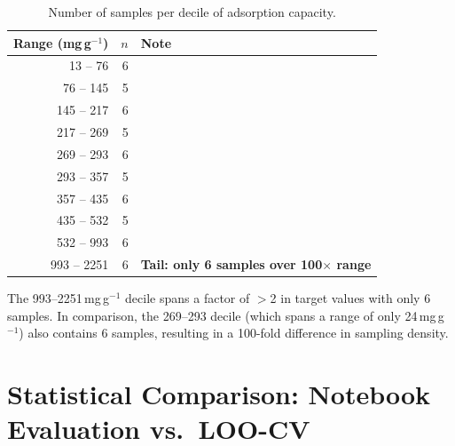 \documentclass[12pt,a4paper]{article}
\begin{document}
\begin{table}[h]
\centering
\caption{Number of samples per decile of adsorption capacity.}
\label{tab:decile}
\small
\begin{tabular}{rrl}
\toprule
Range (mg\,g$^{-1}$) & $n$ & Note \\
\midrule
  13 -- 76   & 6 & \\
  76 -- 145  & 5 & \\
 145 -- 217  & 6 & \\
 217 -- 269  & 5 & \\
 269 -- 293  & 6 & \\
 293 -- 357  & 5 & \\
 357 -- 435  & 6 & \\
 435 -- 532  & 5 & \\
 532 -- 993  & 6 & \\
 993 -- 2251 & 6 & \textbf{Tail: only 6 samples over 100$\times$ range} \\
\bottomrule
\end{tabular}
\end{table}

The 993--2251\,mg\,g$^{-1}$ decile spans a factor of $>$2 in target
values with only 6 samples.  In comparison, the 269--293 decile (which
spans a range of only 24\,mg\,g$^{-1}$) also contains 6 samples,
resulting in a 100-fold difference in sampling density.

\section{Statistical Comparison: Notebook Evaluation vs.\ LOO-CV}
\label{sec:eval_comparison}
\end{document}
